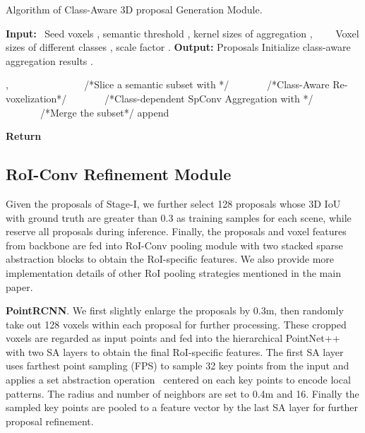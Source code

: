 \documentclass{article}
\begin{document}
\begin{algorithm} 
  \caption{Algorithm of Class-Aware 3D proposal Generation Module.}
  \begin{algorithmic}[1] \label{algo:calg}
      \Statex \textbf{Input:} ~Seed voxels , semantic threshold , kernel sizes of aggregation ,
      \Statex  ~~~~Voxel sizes of different classes , scale factor .
      \Statex \textbf{Output:} Proposals 
      \State Initialize class-aware aggregation results .
      
      \State , ~~~~~~~ 
          \Statex ~~~~~~~{\color{blue}/*Slice a semantic subset with */}
          \State 
          \Statex ~~~~~~~{\color{blue}/*Class-Aware Re-voxelization*/}
          \vspace{4pt}
          \State 
          \Statex ~~~~~~~{\color{blue}/*Class-dependent SpConv Aggregation with */}
          \State 
          \Statex ~~~~~~~{\color{blue}/*Merge the subset*/}
          \State   append   
      \EndFor 
      
      \State 
      \State \textbf{Return }
  \end{algorithmic}
\end{algorithm} 

\subsection{RoI-Conv Refinement Module}
Given the proposals of Stage-I, we further select 128 proposals whose 3D IoU with ground truth are greater than 0.3 as training samples for each scene, while reserve all proposals during inference. Finally, the proposals and voxel features from backbone are fed into RoI-Conv pooling module with two stacked sparse abstraction blocks to obtain the RoI-specific features. We also provide more implementation details of other RoI pooling strategies mentioned in the main paper. 


\textbf{PointRCNN}. We first slightly enlarge the proposals by 0.3m, then randomly take out 128 voxels  within each proposal for further processing. These cropped voxels are regarded as input points and fed into the hierarchical PointNet++ ~\cite{qi2018pointnnetplus} with two SA layers to obtain the final RoI-specific features. The first SA layer uses farthest point sampling (FPS) to sample 32 key points from the input and applies a set abstraction operation~\cite{qi2017pointnet} centered on each key points to encode local patterns. The radius and number of neighbors are set to 0.4m and 16. Finally the sampled key points are pooled to a feature vector by the last SA layer for further proposal refinement. 
\end{document}
